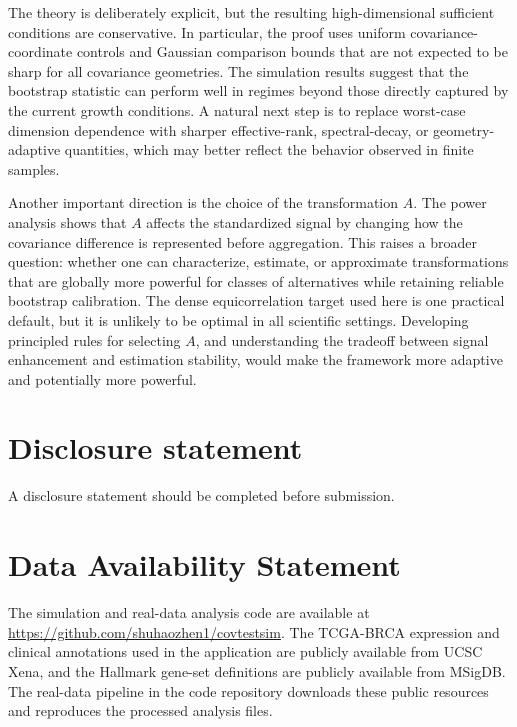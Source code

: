 \documentclass[
  12pt]{article}
\theoremstyle{plain}
\theoremstyle{definition}
\theoremstyle{remark}
\begin{document}
The theory is deliberately explicit, but the resulting high-dimensional
sufficient conditions are conservative.  In particular, the proof uses
uniform covariance-coordinate controls and Gaussian comparison bounds that are
not expected to be sharp for all covariance geometries.  The simulation results
suggest that the bootstrap statistic can perform well in regimes beyond those
directly captured by the current growth conditions.  A natural next step is to
replace worst-case dimension dependence with sharper effective-rank,
spectral-decay, or geometry-adaptive quantities, which may better reflect the
behavior observed in finite samples.

Another important direction is the choice of the transformation \(A\).  The
power analysis shows that \(A\) affects the standardized signal by changing how
the covariance difference is represented before aggregation.  This raises a
broader question: whether one can characterize, estimate, or approximate
transformations that are globally more powerful for classes of alternatives
while retaining reliable bootstrap calibration.  The dense equicorrelation
target used here is one practical default, but it is unlikely to be optimal in
all scientific settings.  Developing principled rules for selecting \(A\), and
understanding the tradeoff between signal enhancement and estimation stability,
would make the framework more adaptive and potentially more powerful.

\section{Disclosure statement}\label{disclosure-statement}

A disclosure statement should be completed before submission.

\section{Data Availability Statement}\label{data-availability-statement}

The simulation and real-data analysis code are available at
\url{https://github.com/shuhaozhen1/covtestsim}.  The TCGA-BRCA expression and
clinical annotations used in the application are publicly available from UCSC
Xena, and the Hallmark gene-set definitions are publicly available from MSigDB.
The real-data pipeline in the code repository downloads these public resources
and reproduces the processed analysis files.

\label{supplementary-material}
\bigskip
\end{document}
